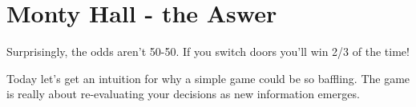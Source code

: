\documentclass[]{article}
\begin{document}
\section{Monty Hall - the Aswer}
Surprisingly, the odds aren’t 50-50. If you switch doors you’ll win 2/3 of the time!

Today let’s get an intuition for why a simple game could be so baffling. The game is really about re-evaluating your decisions as new information emerges.
\end{document}
